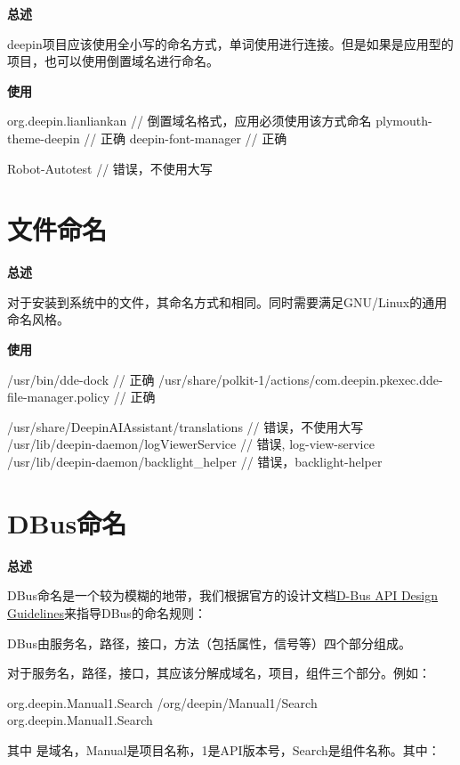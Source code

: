 \textbf{总述}

deepin项目应该使用全小写的命名方式，单词使用\cppinline{-}进行连接。但是如果是应用型的项目，也可以使用倒置域名进行命名。

\textbf{使用}

\begin{cppcode}
  org.deepin.lianliankan // 倒置域名格式，应用必须使用该方式命名
  plymouth-theme-deepin  // 正确
  deepin-font-manager    // 正确

  Robot-Autotest         // 错误，不使用大写
\end{cppcode}

\section{文件命名}

\textbf{总述}

对于安装到系统中的文件，其命名方式和相同。同时需要满足GNU/Linux的通用命名风格。

\textbf{使用}

\begin{cppcode}
  /usr/bin/dde-dock  // 正确
  /usr/share/polkit-1/actions/com.deepin.pkexec.dde-file-manager.policy  // 正确

  /usr/share/DeepinAIAssistant/translations  // 错误，不使用大写
  /usr/lib/deepin-daemon/logViewerService    // 错误, log-view-service
  /usr/lib/deepin-daemon/backlight_helper    // 错误，backlight-helper
\end{cppcode}

\section{DBus命名}

\textbf{总述}

DBus命名是一个较为模糊的地带，我们根据官方的设计文档\href{https://dbus.freedesktop.org/doc/dbus-api-design.html}{D-Bus API Design Guidelines}来指导DBus的命名规则：

DBus由服务名，路径，接口，方法（包括属性，信号等）四个部分组成。

对于服务名，路径，接口，其应该分解成域名，项目，组件三个部分。例如：

\begin{cppcode}
  org.deepin.Manual1.Search
  /org/deepin/Manual1/Search
  org.deepin.Manual1.Search
\end{cppcode}

其中  是域名，Manual是项目名称，1是API版本号，Search是组件名称。其中：

